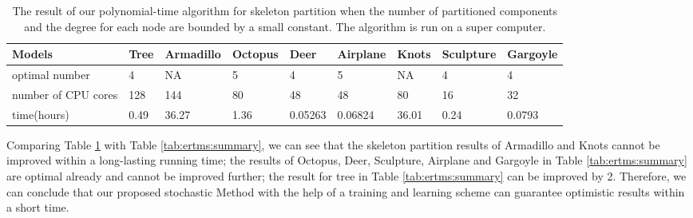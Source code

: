 \begin{table}[htb]

\begin{footnotesize}

\begin{center}

    \begin{tabular}{p{3.0cm} p{1.55cm} p{1.3cm} p{1.0cm} p{1.3cm} p{2.25cm} p{1.2cm} p{1.2cm}p{1.4cm}}

    \hline

     Models          & Tree           & Armadillo      & Octopus   & Deer      & Airplane      & Knots    &Sculpture  & Gargoyle\\ \hline
     optimal number   & 4             & NA              & 5         & 4         & 5             & NA      & 4         &4 \\ \hline
     number of CPU cores &128         & 144            & 80        & 48        &48             & 80       &16         &32 \\ \hline
     time(hours)     &0.49            & 36.27          & 1.36      &0.05263   &0.06824        & 36.01    &0.24       &0.0793 \\ \hline

    \end{tabular}

\end{center}

\end{footnotesize}

\caption{The result of our polynomial-time algorithm for skeleton partition when the number of partitioned components and the degree for each node are bounded by a small constant. The algorithm is run on a super computer.}\label{tab:ertms:super}

\end{table}


Comparing Table \ref{tab:ertms:super} with Table \ref{tab:ertms:summary}, we can see that the skeleton partition results of Armadillo and Knots cannot be improved within a long-lasting running time; the results of Octopus, Deer, Sculpture, Airplane and Gargoyle in Table \ref{tab:ertms:summary} are optimal already and cannot be improved further; the result for tree in Table \ref{tab:ertms:summary} can be improved by 2.
{ Therefore, we can conclude that our proposed stochastic Method with the help of a training and learning scheme can guarantee optimistic results within a short time.}



